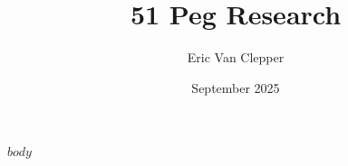 \documentclass[12pt]{article}
\title{51 Peg Research}
\author{Eric Van Clepper}
\date{September 2025}
\begin{document}
\thispagestyle{fancy}

$body$
\end{document}
